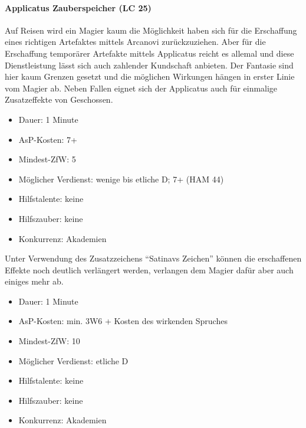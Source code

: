 \paragraph{Applicatus Zauberspeicher (LC 25)}
Auf Reisen wird ein Magier kaum die Möglichkeit haben sich für die Erschaffung eines richtigen Artefaktes mittels Arcanovi zurückzuziehen. Aber für die Erschaffung temporärer Artefakte mittels Applicatus reicht es allemal und diese Dienstleistung lässt sich auch zahlender Kundschaft anbieten. Der Fantasie sind hier kaum Grenzen gesetzt und die möglichen Wirkungen hängen in erster Linie vom Magier ab. Neben Fallen eignet sich der Applicatus auch für einmalige Zusatzeffekte von Geschossen.
\begin{itemize}
	\item Dauer: 1 Minute
	\item AsP-Kosten: 7+
	\item Mindest-ZfW: 5
	\item Möglicher Verdienst: wenige bis etliche D; \SI{7}{\D}+ (HAM 44)
	\item Hilfstalente: keine
	\item Hilfszauber: keine
	\item Konkurrenz: Akademien
\end{itemize}
Unter Verwendung des Zusatzzeichens \enquote{Satinavs Zeichen} können die erschaffenen Effekte noch deutlich verlängert werden, verlangen dem Magier dafür aber auch einiges mehr ab.
\begin{itemize}
	\item Dauer: 1 Minute
	\item AsP-Kosten: min. 3W6 + Kosten des wirkenden Spruches
	\item Mindest-ZfW: 10
	\item Möglicher Verdienst: etliche D
	\item Hilfstalente: keine
	\item Hilfszauber: keine
	\item Konkurrenz: Akademien
\end{itemize}

